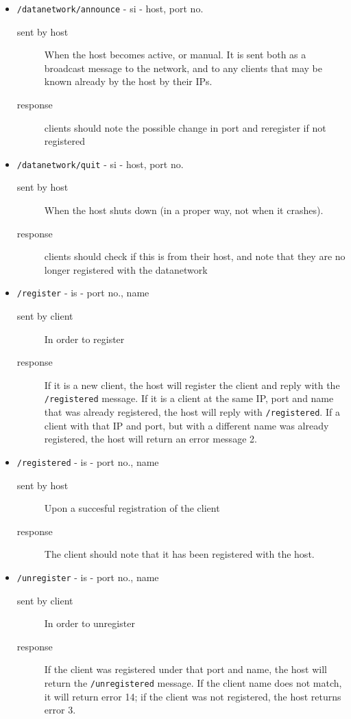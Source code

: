 \documentclass[letterpaper,10pt]{article}
\begin{document}
\begin{itemize}
 \item \verb|/datanetwork/announce| - si - host, port no. 
    \begin{description}
    \item[sent by host] When the host becomes active, or manual. It is sent both as a broadcast message to the network, and to any clients that may be known already by the host by their IPs.
    \item[response] clients should note the possible change in port and reregister if not registered
   \end{description}

\item \verb|/datanetwork/quit| - si - host, port no.
    \begin{description}
    \item[sent by host] When the host shuts down (in a proper way, not when it crashes).
    \item[response] clients should check if this is from their host, and note that they are no longer registered with the datanetwork
   \end{description}

\item \verb|/register| - is - port no., name
    \begin{description}
     \item[sent by client] In order to register
     \item[response] If it is a new client, the host will register the client and reply with the \verb|/registered| message. If it is a client at the same IP, port and name that was already registered, the host will reply with \verb|/registered|. If a client with that IP and port, but with a different name was already registered, the host will return an error message 2.
   \end{description}

\item \verb|/registered| - is - port no., name
    \begin{description}
     \item[sent by host] Upon a succesful registration of the client
     \item[response] The client should note that it has been registered with the host.
   \end{description}

\item \verb|/unregister| - is - port no., name
    \begin{description}
     \item[sent by client] In order to unregister
     \item[response] If the client was registered under that port and name, the host will return the \verb|/unregistered| message. If the client name does not match, it will return error 14; if the client was not registered, the host returns error 3.
   \end{description}


\end{itemize}
\end{document}
